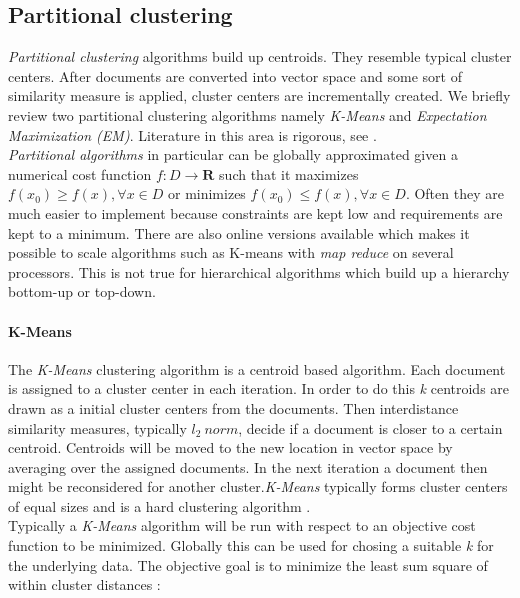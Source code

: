   \subsection{Partitional clustering}
    \emph{Partitional clustering} algorithms build up centroids. They resemble typical cluster centers. After documents are converted into vector space and some sort of similarity measure is applied, cluster centers are incrementally created. We briefly review two partitional clustering algorithms namely \emph{K-Means} and \emph{Expectation Maximization (EM)}. Literature in this area is rigorous, see \cite{ClusteringBooAggarwalk2013, NextFrontierClustering2013, IRBookStanford2008}.\\

    \emph{Partitional algorithms} in particular can be globally approximated given a numerical cost function $f:D \to \mathbf{R}$ such that it maximizes $f(x_0) \geq f(x), \forall x \in D$  or minimizes $f(x_0) \leq f(x), \forall x \in D$. Often they are much easier to implement because constraints are kept low and requirements are kept to a minimum. There are also online versions available which makes it possible to scale algorithms such as K-means with \emph{map reduce} on several processors. This is not true for hierarchical algorithms which build up a hierarchy bottom-up or top-down.\\

    \paragraph{K-Means}
    The \emph{K-Means} clustering algorithm is a centroid based algorithm. Each document is assigned to a cluster center in each iteration. In order to do this \emph{k} centroids are drawn as a initial cluster centers from the documents. Then interdistance similarity measures, typically $l_2\:norm$, decide if a document is closer to a certain centroid. Centroids will be moved to the new location in vector space by averaging over the assigned documents. In the next iteration a document then might be reconsidered for another cluster.\emph{K-Means} typically forms cluster centers of equal sizes and is a hard clustering algorithm \cite{IRBookStanford2008}.\\
    Typically a \emph{K-Means} algorithm will be run with respect to an objective cost function to be minimized. Globally this can be used for chosing a suitable \emph{k} for the underlying data. The objective goal is to minimize the least sum square of within cluster distances \cite{IRBookStanford2008}:

